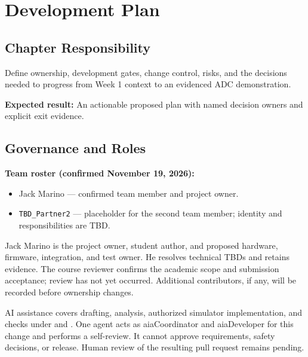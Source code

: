 \chapter{Development Plan}

\section{Chapter Responsibility}
\label{Section:DevelopmentPlanResponsibility}
Define ownership, development gates, change control, risks, and the decisions
needed to progress from Week 1 context to an evidenced ADC demonstration.

\noindent\textbf{Expected result:} An actionable proposed plan with named
decision owners and explicit exit evidence.

\section{Governance and Roles}
\noindent\textbf{Team roster (confirmed November 19, 2026):}
\begin{itemize}
\item Jack Marino --- confirmed team member and project owner.
\item \texttt{TBD\_Partner2} --- placeholder for the second team member; identity and responsibilities are TBD.
\end{itemize}

Jack Marino is the project owner, student author, and proposed hardware,
firmware, integration, and test owner. He resolves technical TBDs and retains
evidence. The course reviewer confirms the academic scope and submission
acceptance; review has not yet occurred. Additional contributors, if any,
will be recorded before ownership changes.

AI assistance covers drafting, analysis, authorized simulator implementation,
and checks under
 and .
One agent acts as aiaCoordinator and aiaDeveloper for this change and performs
a self-review. It cannot approve requirements, safety decisions, or release.
Human review of the resulting pull request remains pending.


